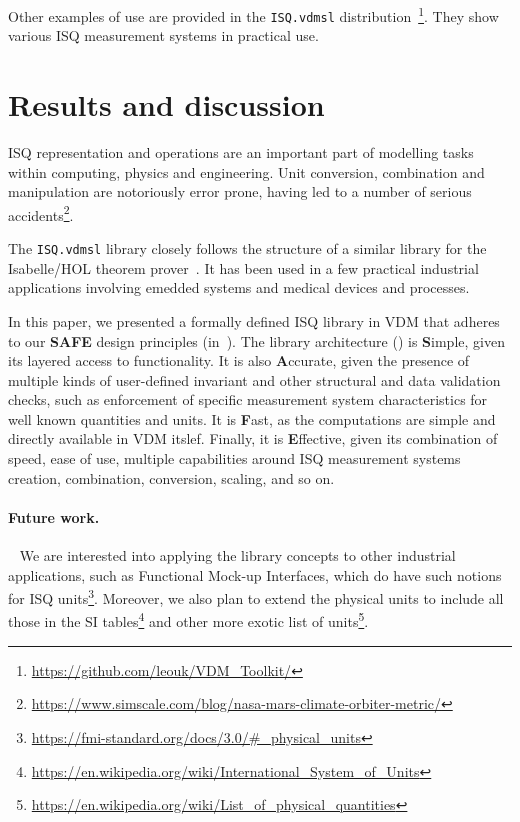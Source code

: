 \documentclass[runningheads,a4paper]{llncs}
\begin{document}
Other examples of use are provided in the \texttt{ISQ.vdmsl} distribution~\footnote{\url{https://github.com/leouk/VDM_Toolkit/}}. They show various ISQ measurement systems in practical use.

\section{Results and discussion}\label{sec:Results}

\gls{ISQ} representation and operations are an important part of modelling tasks within computing, physics and engineering. Unit conversion, combination and manipulation are notoriously error prone, having led to a number of serious accidents\footnote{\url{https://www.simscale.com/blog/nasa-mars-climate-orbiter-metric/}}.%

The \texttt{ISQ.vdmsl} library closely follows the structure of a similar library for the Isabelle/HOL theorem prover~\cite{Physical_Quantities-AFP}. It has been used in a few practical industrial applications involving emedded systems and medical devices and processes.  

In this paper, we presented a formally defined \gls{ISQ} library in VDM that adheres to our \textbf{SAFE} design principles (in~). The library architecture () is \textbf{S}imple, given its layered access to functionality. It is also \textbf{A}ccurate, given the presence of multiple kinds of user-defined invariant and other structural and data validation checks, such as enforcement of specific measurement system characteristics for well known quantities and units. It is \textbf{F}ast, as the computations are simple and directly available in VDM itslef. Finally, it is \textbf{E}ffective, given its combination of speed, ease of use, multiple capabilities around ISQ measurement systems creation, combination, conversion, scaling, and so on.   

\paragraph*{Future work.}~
%
We are interested into applying the library concepts to other industrial applications, such as Functional Mock-up Interfaces, which do have such notions for ISQ units\footnote{\url{https://fmi-standard.org/docs/3.0/\#_physical_units}}. Moreover, we also plan to extend the physical units to include all those in the SI tables\footnote{\url{https://en.wikipedia.org/wiki/International_System_of_Units}} and other more exotic list of units\footnote{\url{https://en.wikipedia.org/wiki/List_of_physical_quantities}}. 
\end{document}

